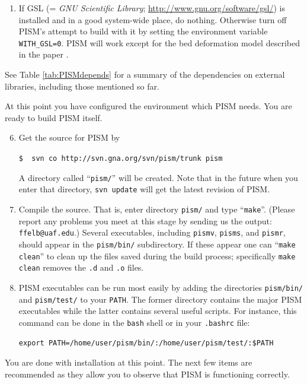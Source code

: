 \documentclass[11pt,final]{amsart}
\renewcommand{\t}[1]{\texttt{#1}}
\begin{document}
\begin{enumerate}
\begin{enumerate}
\item If GSL (= \emph{GNU Scientific Library}; \url{http://www.gnu.org/software/gsl/}) is installed and in a good system-wide place, do nothing.  Otherwise turn off PISM's attempt to build with it by setting the environment variable \verb|WITH_GSL=0|.  PISM will work except for the bed deformation model described in the paper \cite{BLKfastearth}.
\end{enumerate}
\end{enumerate}

\bigskip
See Table \ref{tab:PISMdepends} for a summary of the dependencies on external libraries, including those mentioned so far.

\medskip
At this point you have configured the environment which PISM needs.  You are ready to build PISM itself.
\bigskip

\begin{enumerate}\setcounter{enumi}{5}
\item \label{getPISMstep} Get the source for PISM by

\verb|$  svn co http://svn.gna.org/svn/pism/trunk pism|

\noindent A directory called ``\verb|pism/|'' will be created.  Note that in the future when you enter that directory, \verb|svn update| will get the latest revision of PISM.

\item Compile the source.  That is, enter directory \verb|pism/| and type ``\verb|make|''.  (Please report any problems you meet at this stage by sending us the output: \verb|ffelb@uaf.edu|.)  Several executables, including \verb|pismv|, \verb|pisms|, and \verb|pismr|, should appear in the \verb|pism/bin/| subdirectory.  If these appear one can ``\verb|make clean|'' to clean up the files saved during the build process; specifically \verb|make clean| removes the \t{.d} and \t{.o} files.

\item PISM executables can be run most easily by adding the directories \verb|pism/bin/| and \verb|pism/test/| to your \verb|PATH|.  The former directory contains the major PISM executables while the latter contains several useful scripts.  For instance, this command can be done in the \verb|bash| shell or in your \verb|.bashrc| file:

\verb|export PATH=/home/user/pism/bin/:/home/user/pism/test/:$PATH|
\end{enumerate}

\bigskip
You are done with installation at this point.  The next few items are recommended as they allow you to observe that PISM is functioning correctly.
\bigskip
\end{document}
